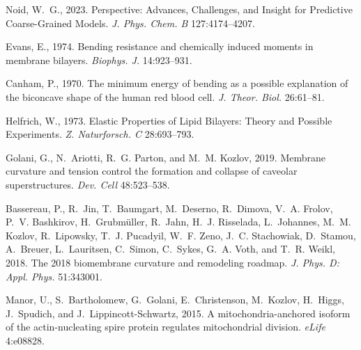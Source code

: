 \documentclass[twocolumn]{biophys-new}
\begin{document}
\begin{thebibliography}{52}
\providecommand{\url}[1]{\texttt{#1}}
\providecommand{\urlprefix}{ }

Noid, W.~G., 2023.
\newblock Perspective: Advances, Challenges, and Insight for Predictive
  Coarse-Grained Models.
\newblock \emph{J. Phys. Chem. B} 127:4174--4207.

Evans, E., 1974.
\newblock Bending resistance and chemically induced moments in membrane
  bilayers.
\newblock \emph{Biophys. J.} 14:923--931.

Canham, P., 1970.
\newblock The minimum energy of bending as a possible explanation of the
  biconcave shape of the human red blood cell.
\newblock \emph{J. Theor. Biol.} 26:61--81.

Helfrich, W., 1973.
\newblock Elastic Properties of Lipid Bilayers: Theory and Possible
  Experiments.
\newblock \emph{Z. Naturforsch. C} 28:693--793.

Golani, G., N.~Ariotti, R.~G. Parton, and M.~M. Kozlov, 2019.
\newblock Membrane curvature and tension control the formation and collapse of
  caveolar superstructures.
\newblock \emph{Dev. Cell} 48:523--538.

Bassereau, P., R.~Jin, T.~Baumgart, M.~Deserno, R.~Dimova, V.~A. Frolov, P.~V.
  Bashkirov, H.~Grubmüller, R.~Jahn, H.~J. Risselada, L.~Johannes, M.~M.
  Kozlov, R.~Lipowsky, T.~J. Pucadyil, W.~F. Zeno, J.~C. Stachowiak, D.~Stamou,
  A.~Breuer, L.~Lauritsen, C.~Simon, C.~Sykes, G.~A. Voth, and T.~R. Weikl,
  2018.
\newblock The 2018 biomembrane curvature and remodeling roadmap.
\newblock \emph{J. Phys. D: Appl. Phys.} 51:343001.

Manor, U., S.~Bartholomew, G.~Golani, E.~Christenson, M.~Kozlov, H.~Higgs,
  J.~Spudich, and J.~Lippincott-Schwartz, 2015.
\newblock A mitochondria-anchored isoform of the actin-nucleating spire protein
  regulates mitochondrial division.
\newblock \emph{eLife} 4:e08828.


\end{thebibliography}
\end{document}
